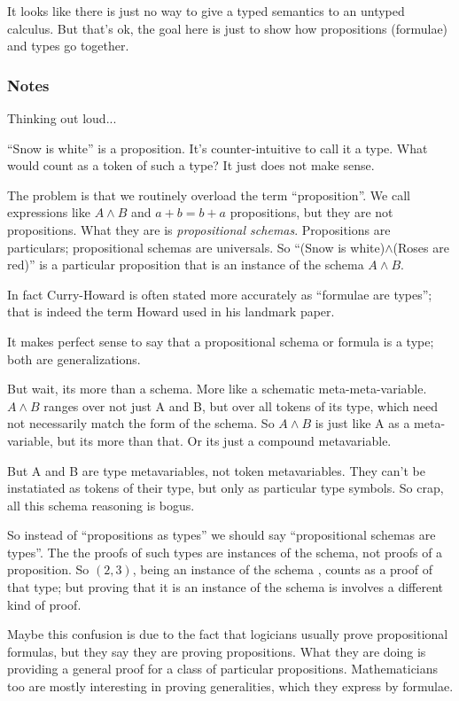 \documentclass{article}
\begin{document}
It looks like there is just no way to give a typed semantics to an
untyped calculus. But that's ok, the goal here is just to show how
propositions (formulae) and types go together.


\subsubsection{Notes}

Thinking out loud...

``Snow is white'' is a proposition. It's counter-intuitive to call it
a type. What would count as a token of such a type? It just does not
make sense.

The problem is that we routinely overload the term ``proposition''. We
call expressions like \(A\land B\) and \(a+b=b+a\) propositions, but
they are not propositions. What they are is \textit{propositional
  schemas}. Propositions are particulars; propositional schemas are
universals. So ``(Snow is white)\(\land\)(Roses are red)'' is a
particular proposition that is an instance of the schema \(A\land B\).

In fact Curry-Howard is often stated more accurately as ``formulae are
types''; that is indeed the term Howard used in his landmark paper.

It makes perfect sense to say that a propositional schema or formula
is a type; both are generalizations.

But wait, its more than a schema. More like a schematic
meta-meta-variable. \(A\land B\) ranges over not just A and B, but
over all tokens of its type, which need not necessarily match the form
of the schema. So \(A\land B\) is just like A as a meta-variable, but
its more than that.  Or its just a compound metavariable.

But A and B are type metavariables, not token metavariables. They
can't be instatiated as tokens of their type, but only as particular
type symbols. So crap, all this schema reasoning is bogus.

So instead of ``propositions as types'' we should say ``propositional
schemas are types''. The the proofs of such types are instances of the
schema, not proofs of a proposition. So \((2,3)\), being an instance
of the schema \(\), counts as a proof of that type; but proving that
it is an instance of the schema is involves a different kind of proof.

Maybe this confusion is due to the fact that logicians usually prove
propositional formulas, but they say they are proving propositions.
What they are doing is providing a general proof for a class of
particular propositions. Mathematicians too are mostly interesting in
proving generalities, which they express by formulae.
\end{document}
